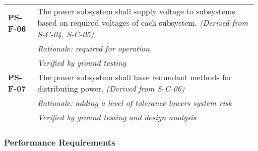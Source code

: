 \begin{longtable}{P{2cm}P{13.25cm}}
\textbf{PS-F-06}	& The power subsystem shall supply voltage to subsystems based on required voltages of each subsystem. \textit{(Derived from S-C-04, S-C-05)} \\
 & \textit{Rationale: required for operation} \\
 & \textit{Verified by ground testing}		\\

\textbf{PS-F-07}	& The power subsystem shall have redundant methods for distributing power. \textit{(Derived from S-C-06)} \\
 & \textit{Rationale: adding a level of tolerance lowers system risk} \\
 & \textit{Verified by ground testing and design analysis}	
\end{longtable}
\vspace{-15pt}
\subsubsection*{Performance Requirements}
\vspace{-15pt}
